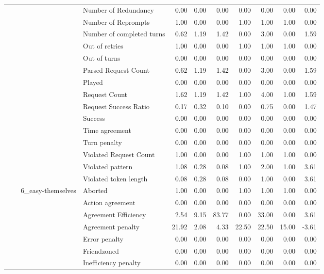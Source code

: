 \begin{tabular}{llllrrrrrrr}
 &  &  & Number of Redundancy & 0.00 & 0.00 & 0.00 & 0.00 & 0.00 & 0.00 & 0.00 \\
 &  &  & Number of Reprompts & 1.00 & 0.00 & 0.00 & 1.00 & 1.00 & 1.00 & 0.00 \\
 &  &  & Number of completed turns & 0.62 & 1.19 & 1.42 & 0.00 & 3.00 & 0.00 & 1.59 \\
 &  &  & Out of retries & 1.00 & 0.00 & 0.00 & 1.00 & 1.00 & 1.00 & 0.00 \\
 &  &  & Out of turns & 0.00 & 0.00 & 0.00 & 0.00 & 0.00 & 0.00 & 0.00 \\
 &  &  & Parsed Request Count & 0.62 & 1.19 & 1.42 & 0.00 & 3.00 & 0.00 & 1.59 \\
 &  &  & Played & 0.00 & 0.00 & 0.00 & 0.00 & 0.00 & 0.00 & 0.00 \\
 &  &  & Request Count & 1.62 & 1.19 & 1.42 & 1.00 & 4.00 & 1.00 & 1.59 \\
 &  &  & Request Success Ratio & 0.17 & 0.32 & 0.10 & 0.00 & 0.75 & 0.00 & 1.47 \\
 &  &  & Success & 0.00 & 0.00 & 0.00 & 0.00 & 0.00 & 0.00 & 0.00 \\
 &  &  & Time agreement & 0.00 & 0.00 & 0.00 & 0.00 & 0.00 & 0.00 & 0.00 \\
 &  &  & Turn penalty & 0.00 & 0.00 & 0.00 & 0.00 & 0.00 & 0.00 & 0.00 \\
 &  &  & Violated Request Count & 1.00 & 0.00 & 0.00 & 1.00 & 1.00 & 1.00 & 0.00 \\
 &  &  & Violated pattern & 1.08 & 0.28 & 0.08 & 1.00 & 2.00 & 1.00 & 3.61 \\
 &  &  & Violated token length & 0.08 & 0.28 & 0.08 & 0.00 & 1.00 & 0.00 & 3.61 \\
\cline{3-11}
 &  & \multirow[t]{27}{*}{6_easy-themselves} & Aborted & 1.00 & 0.00 & 0.00 & 1.00 & 1.00 & 1.00 & 0.00 \\
 &  &  & Action agreement & 0.00 & 0.00 & 0.00 & 0.00 & 0.00 & 0.00 & 0.00 \\
 &  &  & Agreement Efficiency & 2.54 & 9.15 & 83.77 & 0.00 & 33.00 & 0.00 & 3.61 \\
 &  &  & Agreement penalty & 21.92 & 2.08 & 4.33 & 22.50 & 22.50 & 15.00 & -3.61 \\
 &  &  & Error penalty & 0.00 & 0.00 & 0.00 & 0.00 & 0.00 & 0.00 & 0.00 \\
 &  &  & Friendzoned & 0.00 & 0.00 & 0.00 & 0.00 & 0.00 & 0.00 & 0.00 \\
 &  &  & Inefficiency penalty & 0.00 & 0.00 & 0.00 & 0.00 & 0.00 & 0.00 & 0.00 \\

\end{tabular}
